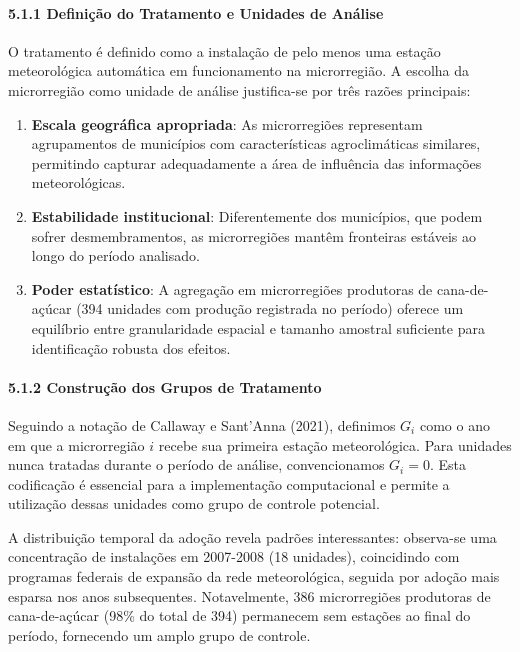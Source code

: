 \documentclass[
  brazilian,
  12pt,
  a4paper,
]{article}
\begin{document}
\paragraph{\texorpdfstring{\textbf{5.1.1 Definição do Tratamento e
Unidades de
Análise}}{5.1.1 Definição do Tratamento e Unidades de Análise}}\label{definiuxe7uxe3o-do-tratamento-e-unidades-de-anuxe1lise}

O tratamento é definido como a instalação de pelo menos uma estação
meteorológica automática em funcionamento na microrregião. A escolha da
microrregião como unidade de análise justifica-se por três razões
principais:

\begin{enumerate}
\def\labelenumi{\arabic{enumi}.}
\item
  \textbf{Escala geográfica apropriada}: As microrregiões representam
  agrupamentos de municípios com características agroclimáticas
  similares, permitindo capturar adequadamente a área de influência das
  informações meteorológicas.
\item
  \textbf{Estabilidade institucional}: Diferentemente dos municípios,
  que podem sofrer desmembramentos, as microrregiões mantêm fronteiras
  estáveis ao longo do período analisado.
\item
  \textbf{Poder estatístico}: A agregação em microrregiões produtoras de
  cana-de-açúcar (394 unidades com produção registrada no período)
  oferece um equilíbrio entre granularidade espacial e tamanho amostral
  suficiente para identificação robusta dos efeitos.
\end{enumerate}

\paragraph{\texorpdfstring{\textbf{5.1.2 Construção dos Grupos de
Tratamento}}{5.1.2 Construção dos Grupos de Tratamento}}\label{construuxe7uxe3o-dos-grupos-de-tratamento}

Seguindo a notação de Callaway e Sant'Anna (2021), definimos \(G_i\)
como o ano em que a microrregião \(i\) recebe sua primeira estação
meteorológica. Para unidades nunca tratadas durante o período de
análise, convencionamos \(G_i = 0\). Esta codificação é essencial para a
implementação computacional e permite a utilização dessas unidades como
grupo de controle potencial.

A distribuição temporal da adoção revela padrões interessantes:
observa-se uma concentração de instalações em 2007-2008 (18 unidades),
coincidindo com programas federais de expansão da rede meteorológica,
seguida por adoção mais esparsa nos anos subsequentes. Notavelmente, 386
microrregiões produtoras de cana-de-açúcar (98\% do total de 394)
permanecem sem estações ao final do período, fornecendo um amplo grupo
de controle.
\end{document}
